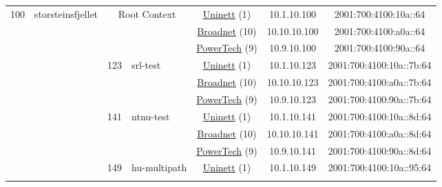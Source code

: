 \begin{small}
\begin{center}
\begin{longtable}{|c|c|c|c|c|c|c|c|}
 \multirow{36}{*}{\tiny{100}} & \multicolumn{1}{|l|}{\multirow{36}{*}{\tiny{storsteinsfjellet}}} & \multicolumn{2}{|c|}{\multirow{3}{*}{\tiny{Root Context}}} & \multicolumn{2}{|c|}{\tiny{\href{https://www.uninett.no}{Uninett} (1)}} & \tiny{10.1.10.100} & \tiny{2001:700:4100:10a::64} \\* \cline{5-5}\cline{6-6}\cline{7-7}\cline{8-8}
  &  & \multicolumn{2}{|c|}{} & \multicolumn{2}{|c|}{\tiny{\href{https://www.broadnet.no}{Broadnet} (10)}} & \tiny{10.10.10.100} & \tiny{2001:700:4100:a0a::64} \\* \cline{5-5}\cline{6-6}\cline{7-7}\cline{8-8}
  &  & \multicolumn{2}{|c|}{} & \multicolumn{2}{|c|}{\tiny{\href{http://www.powertech.no}{PowerTech} (9)}} & \tiny{10.9.10.100} & \tiny{2001:700:4100:90a::64} \\* \cline{3-3}\cline{4-4}\cline{5-5}\cline{6-6}\cline{7-7}\cline{8-8}
  &  & \multirow{3}{*}{\tiny{123}} & \multicolumn{1}{|l|}{\multirow{3}{*}{\tiny{srl-test}}} & \multicolumn{2}{|c|}{\tiny{\href{https://www.uninett.no}{Uninett} (1)}} & \tiny{10.1.10.123} & \tiny{2001:700:4100:10a::7b:64} \\* \cline{5-5}\cline{6-6}\cline{7-7}\cline{8-8}
  &  &  &  & \multicolumn{2}{|c|}{\tiny{\href{https://www.broadnet.no}{Broadnet} (10)}} & \tiny{10.10.10.123} & \tiny{2001:700:4100:a0a::7b:64} \\* \cline{5-5}\cline{6-6}\cline{7-7}\cline{8-8}
  &  &  &  & \multicolumn{2}{|c|}{\tiny{\href{http://www.powertech.no}{PowerTech} (9)}} & \tiny{10.9.10.123} & \tiny{2001:700:4100:90a::7b:64} \\* \cline{3-3}\cline{4-4}\cline{5-5}\cline{6-6}\cline{7-7}\cline{8-8}
  &  & \multirow{3}{*}{\tiny{141}} & \multicolumn{1}{|l|}{\multirow{3}{*}{\tiny{ntnu-test}}} & \multicolumn{2}{|c|}{\tiny{\href{https://www.uninett.no}{Uninett} (1)}} & \tiny{10.1.10.141} & \tiny{2001:700:4100:10a::8d:64} \\* \cline{5-5}\cline{6-6}\cline{7-7}\cline{8-8}
  &  &  &  & \multicolumn{2}{|c|}{\tiny{\href{https://www.broadnet.no}{Broadnet} (10)}} & \tiny{10.10.10.141} & \tiny{2001:700:4100:a0a::8d:64} \\* \cline{5-5}\cline{6-6}\cline{7-7}\cline{8-8}
  &  &  &  & \multicolumn{2}{|c|}{\tiny{\href{http://www.powertech.no}{PowerTech} (9)}} & \tiny{10.9.10.141} & \tiny{2001:700:4100:90a::8d:64} \\* \cline{3-3}\cline{4-4}\cline{5-5}\cline{6-6}\cline{7-7}\cline{8-8}
  &  & \multirow{3}{*}{\tiny{149}} & \multicolumn{1}{|l|}{\multirow{3}{*}{\tiny{hu-multipath}}} & \multicolumn{2}{|c|}{\tiny{\href{https://www.uninett.no}{Uninett} (1)}} & \tiny{10.1.10.149} & \tiny{2001:700:4100:10a::95:64} \\* \cline{5-5}\cline{6-6}\cline{7-7}\cline{8-8}

\end{longtable}
\end{center}
\end{small}
